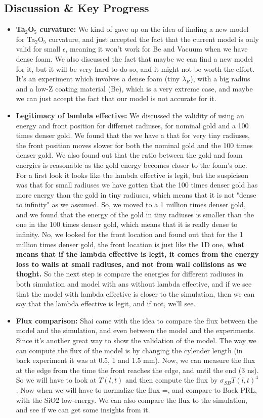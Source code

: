 \documentclass[11pt,a4paper]{article}
\begin{document}
\subsection{Discussion \& Key Progress}
\begin{itemize}
    \item \textbf{Ta$_2$O$_5$ curvature:} We kind of gave up on the idea of finding a new model for Ta$_2$O$_5$ curvature, and just accepted the fact that the current model is only valid for small $\epsilon$, meaning it won't work for Be and Vacuum when we have dense foam. We also discussed the fact that maybe we can find a new model for it, but it will be very hard to do so, and it might not be worth the effort. It's an experiment which involves a dense foam (tiny $\lambda_{R}$), with a big radius and a low-Z coating material (Be), which is a very extreme case, and maybe we can just accept the fact that our model is not accurate for it.
    \item \textbf{Legitimacy of lambda effective:} We discussed the validity of using an energy and front position for differnet radiuses, for nominal gold and a 100 times denser gold. We found that the we have a that for very tiny radiuses, the front position moves slower for both the nominal gold and the 100 times denser gold. We also found out that the ratio between the gold and foam energies is reasonable as the gold energy becomes closer to the foam's one. For a first look it looks like the lambda effective is legit, but the suspicison was that for small radiuses we have gotten that the 100 times denser gold has more energy than the gold in tiny radiuses, which means that it is not "dense to infinity" as we assumed. So, we moved to a 1 million times denser gold, and we found that the energy of the gold in tiny radiuses is smaller than the one in the 100 times denser gold, which means that it is really dense to infinity. No, we looked for the front location and found out that for the 1 million times denser gold, the front location is just like the 1D one, \textbf{what means that if the lambda effective is legit, it comes from the energy loss to walls at small radiuses, and not from wall collisions as we thoght.} So the next step is compare the energies for different radiuses in both simulation and model with ans without lambda effective, and if we see that the model with lambda effective is closer to the simulation, then we can say that the lambda effective is legit, and if not, we'll see. 
    \item \textbf{Flux comparison:} Shai came with the idea to compare the flux between the model and the simulation, and even between the model and the experiments. Since it's another great way to show the validation of the model. The way we can compute the flux of the model is by changing the cylender length (in back experiment it was at 0.5, 1 and 1.5 mm). Now, we can measure the flux at the edge from the time the front reaches the edge, and until the end (3 ns). So we will have to look at $T(l,t)$ and then compute the flux by $\sigma_{SB}T(l,t)^4$. Now when we will have to normalize the flux =, and compare to Back PRL, with the SiO2 low-energy. We can also compare the flux to the simulation, and see if we can get some insights from it.

\end{itemize}
\end{document}

